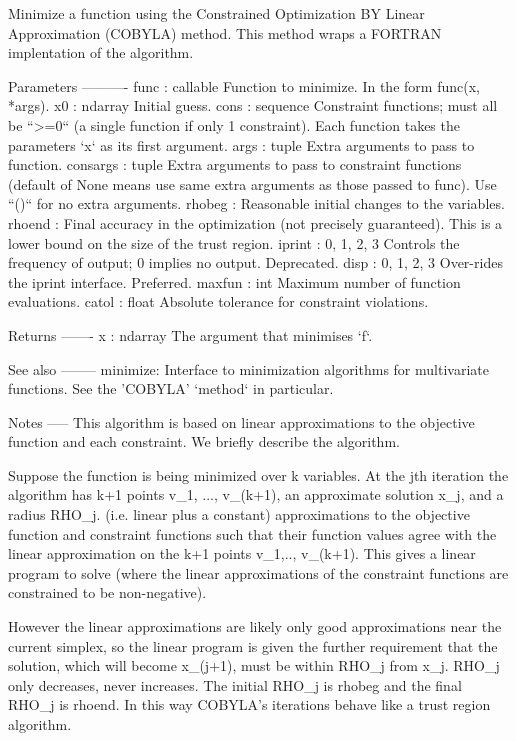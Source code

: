 \begin{DoxyVerb}Minimize a function using the Constrained Optimization BY Linear
Approximation (COBYLA) method. This method wraps a FORTRAN
implentation of the algorithm.

Parameters
----------
func : callable
    Function to minimize. In the form func(x, \\*args).
x0 : ndarray
    Initial guess.
cons : sequence
    Constraint functions; must all be ``>=0`` (a single function
    if only 1 constraint). Each function takes the parameters `x`
    as its first argument.
args : tuple
    Extra arguments to pass to function.
consargs : tuple
    Extra arguments to pass to constraint functions (default of None means
    use same extra arguments as those passed to func).
    Use ``()`` for no extra arguments.
rhobeg :
    Reasonable initial changes to the variables.
rhoend :
    Final accuracy in the optimization (not precisely guaranteed). This
    is a lower bound on the size of the trust region.
iprint : {0, 1, 2, 3}
    Controls the frequency of output; 0 implies no output.  Deprecated.
disp : {0, 1, 2, 3}
    Over-rides the iprint interface.  Preferred.
maxfun : int
    Maximum number of function evaluations.
catol : float
    Absolute tolerance for constraint violations.

Returns
-------
x : ndarray
    The argument that minimises `f`.

See also
--------
minimize: Interface to minimization algorithms for multivariate
    functions. See the 'COBYLA' `method` in particular.

Notes
-----
This algorithm is based on linear approximations to the objective
function and each constraint. We briefly describe the algorithm.

Suppose the function is being minimized over k variables. At the
jth iteration the algorithm has k+1 points v_1, ..., v_(k+1),
an approximate solution x_j, and a radius RHO_j.
(i.e. linear plus a constant) approximations to the objective
function and constraint functions such that their function values
agree with the linear approximation on the k+1 points v_1,.., v_(k+1).
This gives a linear program to solve (where the linear approximations
of the constraint functions are constrained to be non-negative).

However the linear approximations are likely only good
approximations near the current simplex, so the linear program is
given the further requirement that the solution, which
will become x_(j+1), must be within RHO_j from x_j. RHO_j only
decreases, never increases. The initial RHO_j is rhobeg and the
final RHO_j is rhoend. In this way COBYLA's iterations behave
like a trust region algorithm.


\end{DoxyVerb}
